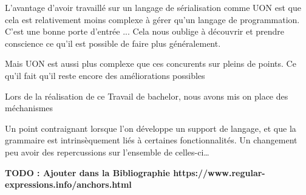 \documentclass[
    iict, %
    il, %
]{heig-tb}
\begin{document}
L'avantage d'avoir travaillé sur un langage de sérialisation comme UON est que cela est relativement moins complexe à gérer qu'un langage de programmation.
C'est une bonne porte d'entrée ...
Cela nous oublige à découvrir et prendre conscience ce qu'il est possible de faire plus généralement.

Mais UON est aussi plus complexe que ces concurents sur pleins de points.
Ce qu'il fait qu'il reste encore des améliorations possibles

Lors de la réalisation de ce Travail de bachelor, nous avons mis on place des méchanismes


Un point contraignant lorsque l'on développe un support de langage, et que la grammaire est intrinsèquement liés à certaines fonctionnalités.
Un changement peu avoir des repercussions sur l'ensemble de celles-ci\dots




\label{glossaire}
\printnoidxglossary
{}

\textbf{TODO : Ajouter dans la Bibliographie https://www.regular-expressions.info/anchors.html}
\printbibliography
{}

\end{document}
